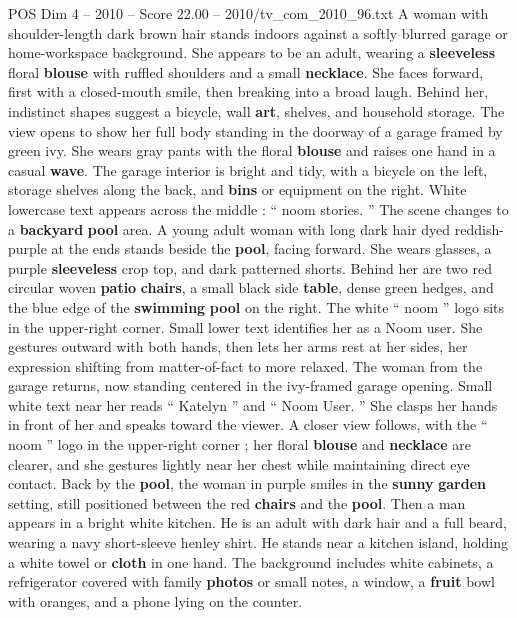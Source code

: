 \begin{textsample}{POS Dim 4 – 2010 – Score 22.00 – 2010/tv\_com\_2010\_96.txt}  \label{ex:f4_pos_023}
A woman with shoulder-length dark brown hair stands indoors against a softly blurred garage or home-workspace background.
She appears to be an adult, wearing a \textbf{sleeveless} floral \textbf{blouse} with ruffled shoulders and a small \textbf{necklace}.
She faces forward, first with a closed-mouth smile, then breaking into a broad laugh.
Behind her, indistinct shapes suggest a bicycle, wall \textbf{art}, shelves, and household storage.
The view opens to show her full body standing in the doorway of a garage framed by green ivy.
She wears gray pants with the floral \textbf{blouse} and raises one hand in a casual \textbf{wave}.
The garage interior is bright and tidy, with a bicycle on the left, storage shelves along the back, and \textbf{bins} or equipment on the right.
White lowercase text appears across the middle : “ noom stories. ” The scene changes to a \textbf{backyard} \textbf{pool} area.
A young adult woman with long dark hair dyed reddish-purple at the ends stands beside the \textbf{pool}, facing forward.
She wears glasses, a purple \textbf{sleeveless} crop top, and dark patterned shorts.
Behind her are two red circular woven \textbf{patio} \textbf{chairs}, a small black side \textbf{table}, dense green hedges, and the blue edge of the \textbf{swimming} \textbf{pool} on the right.
The white “ noom ” logo sits in the upper-right corner.
Small lower text identifies her as a Noom user.
She gestures outward with both hands, then lets her arms rest at her sides, her expression shifting from matter-of-fact to more relaxed.
The woman from the garage returns, now standing centered in the ivy-framed garage opening.
Small white text near her reads “ Katelyn ” and “ Noom User. ” She clasps her hands in front of her and speaks toward the viewer.
A closer view follows, with the “ noom ” logo in the upper-right corner ; her floral \textbf{blouse} and \textbf{necklace} are clearer, and she gestures lightly near her chest while maintaining direct eye contact.
Back by the \textbf{pool}, the woman in purple smiles in the \textbf{sunny} \textbf{garden} setting, still positioned between the red \textbf{chairs} and the \textbf{pool}.
Then a man appears in a bright white kitchen.
He is an adult with dark hair and a full beard, wearing a navy short-sleeve henley shirt.
He stands near a kitchen island, holding a white towel or \textbf{cloth} in one hand.
The background includes white cabinets, a refrigerator covered with family \textbf{photos} or small notes, a window, a \textbf{fruit} bowl with oranges, and a phone lying on the counter.

\end{textsample}
